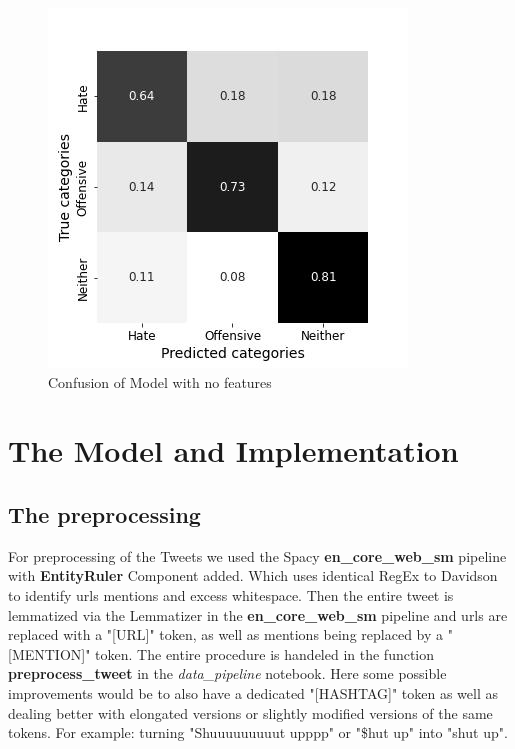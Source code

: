 \documentclass[11pt,a4paper]{article}
\begin{document}
\begin{figure}%
  \includegraphics[width=\linewidth]{nofeat_confusion.jpg}
  \caption{Confusion of Model with no features}
  \label{fig:nofeature_confusion}
\end{figure}


\section{The Model and Implementation}
\subsection{The preprocessing}
For preprocessing of the Tweets we used the Spacy \textbf{en\_core\_web\_sm} pipeline with \textbf{EntityRuler} Component added.
Which uses identical RegEx to Davidson to identify urls mentions and excess whitespace.
Then the entire tweet is lemmatized via the Lemmatizer in the \textbf{en\_core\_web\_sm} pipeline and urls 
are replaced with a "[URL]" token, as well as mentions being replaced by a "[MENTION]" token.
The entire procedure is handeled in the function \textbf{preprocess\_tweet} in the \textit{data\_pipeline} notebook.
Here some possible improvements would be to also have a dedicated "[HASHTAG]" token as well as dealing better with elongated
versions or slightly modified versions of the same tokens. 
For example: turning "Shuuuuuuuuut upppp" or "\$hut up" into "shut up".
\end{document}
